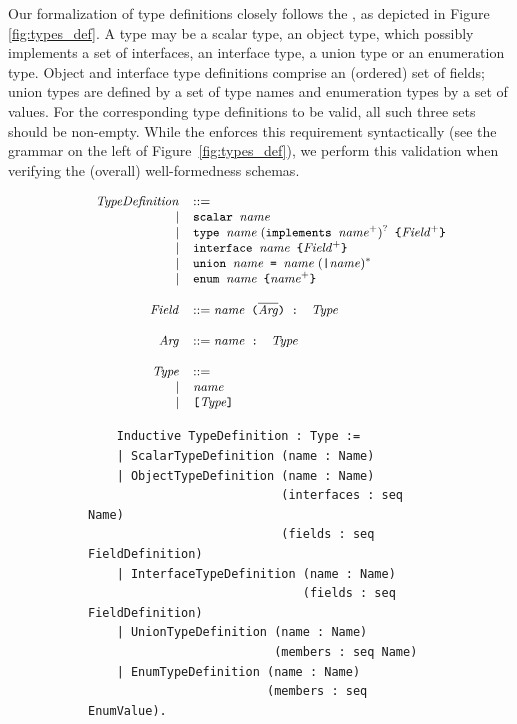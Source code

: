Our formalization of type definitions closely follows the \spec, as
depicted in Figure~ \ref{fig:types_def}. A type may be a scalar type,
an object type, which possibly implements a set of interfaces, an
interface type, a union type or an enumeration type. Object and
interface type definitions comprise an (ordered) set of fields; union
types are defined by a set of type names and enumeration types by a
set of values. For the corresponding type definitions to be valid, all
such three sets should be non-empty. While the \spec enforces this
requirement syntactically (see the grammar on the left of Figure~\ref{fig:types_def}), we perform this validation when verifying the (overall) well-formedness schemas.     
%
\setlength{\grammarparsep}{10pt plus 1pt minus 1pt} %
\begin{figure}[h]
    \centering
    \begin{subfigure}{.5\textwidth}
    \begin{displaymath}
    \small
	\begin{array}{rl}
	\mathit{TypeDefinition} & ::= \\
	 | & \texttt{scalar } \mathit{name}  \\
	 | & \texttt{type } \mathit{name}\; (\texttt{implements } \mathit{name}^{+})^{?} \texttt{ \{} \mathit{Field}^{+} \texttt{\}}\\
	 | & \texttt{interface } \mathit{name} \texttt{ \{} \mathit{Field}^{+} \texttt{\}}\\
	 | & \texttt{union } \mathit{name} \texttt{ = } \mathit{name}\; (\texttt{|} \mathit{name})^{*}\\
	 | & \texttt{enum } \mathit{name} \texttt{ \{} \mathit{name}^{+} \texttt{\}} \\
	& \\
	\mathit{Field} & ::= \mathit{name} \texttt{ (} \mathit{\overline{Arg}} \texttt{) : } \mathit{Type}\\
	& \\
    \mathit{Arg} & ::= \mathit{name} \texttt{ : } \mathit{Type}\\
	& \\
    \mathit{Type} & ::=\\ 
     | & \mathit{name} \\
 	 | &  \texttt{[}  \mathit{Type} \texttt{]}
	\end{array}
	\end{displaymath}
	
    
    \end{subfigure}%
    \begin{subfigure}{.5\textwidth}
    \begin{verbatim}
    Inductive TypeDefinition : Type :=
    | ScalarTypeDefinition (name : Name)
    | ObjectTypeDefinition (name : Name)
                           (interfaces : seq Name)
                           (fields : seq FieldDefinition)
    | InterfaceTypeDefinition (name : Name)
                              (fields : seq FieldDefinition)
    | UnionTypeDefinition (name : Name)
                          (members : seq Name)
    | EnumTypeDefinition (name : Name)
                         (members : seq EnumValue).


\end{verbatim}
\end{subfigure}
\end{figure}
